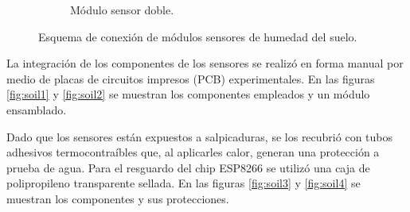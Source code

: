 \begin{figure}[!h]
\begin{subfigure}[b]{0.45\textwidth}
		\caption[Módulo sensor doble]{Módulo sensor doble.}
		\label{fig:soilschem2}
     \end{subfigure}
     \hfill
        \caption[Esquema de conexión de módulos sensores de humedad del suelo]{Esquema de conexión de módulos sensores de humedad del suelo.}	\label{fig:soilschem}
\end{figure}

La integración de los componentes de los sensores se  realizó en forma manual por medio de placas de circuitos impresos (PCB) experimentales. En las figuras \ref{fig:soil1} y \ref{fig:soil2} se muestran los componentes empleados y un módulo ensamblado.

Dado que los sensores están expuestos a salpicaduras, se los recubrió con tubos adhesivos termocontraíbles que, al aplicarles calor, generan una protección a prueba de agua. Para el resguardo del chip ESP8266 se utilizó una caja de polipropileno transparente sellada. En las figuras \ref{fig:soil3} y \ref{fig:soil4} se muestran los componentes y sus protecciones. 

